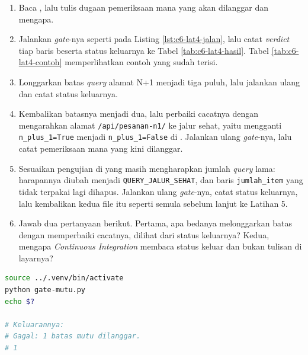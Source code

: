 \begin{enumerate}
  \item Baca , lalu tulis dugaan
        pemeriksaan mana yang akan dilanggar dan mengapa.
  \item Jalankan \textit{gate}-nya seperti pada Listing \ref{lst:c6-lat4-jalan},
        lalu catat \textit{verdict} tiap baris beserta status keluarnya ke
        Tabel \ref{tab:c6-lat4-hasil}. Tabel \ref{tab:c6-lat4-contoh}
        memperlihatkan contoh yang sudah terisi.
  \item Longgarkan batas \textit{query} alamat N+1 menjadi tiga puluh, lalu
        jalankan ulang dan catat status keluarnya.
  \item Kembalikan batasnya menjadi dua, lalu perbaiki cacatnya dengan
        mengarahkan alamat \texttt{/api/pesanan-n1/} ke jalur sehat, yaitu
        mengganti \texttt{n\_plus\_1=True} menjadi \texttt{n\_plus\_1=False}
        di . Jalankan ulang
        \textit{gate}-nya, lalu catat pemeriksaan mana yang kini dilanggar.
  \item Sesuaikan pengujian di 
        yang masih mengharapkan jumlah \textit{query} lama: harapannya diubah
        menjadi \texttt{QUERY\_JALUR\_SEHAT}, dan baris \texttt{jumlah\_item}
        yang tidak terpakai lagi dihapus. Jalankan ulang \textit{gate}-nya,
        catat status keluarnya, lalu kembalikan kedua file itu seperti semula
        sebelum lanjut ke Latihan 5.
  \item Jawab dua pertanyaan berikut. Pertama, apa bedanya melonggarkan batas
        dengan memperbaiki cacatnya, dilihat dari status keluarnya? Kedua,
        mengapa \textit{Continuous Integration} membaca status keluar dan
        bukan tulisan di layarnya?
\end{enumerate}

\begin{lstlisting}[language=bash, caption={Menjalankan gate mutu dan membaca status keluarnya, tersedia di \berkas{sources/chapter06/gate-mutu.py}}, label={lst:c6-lat4-jalan}]
source ../.venv/bin/activate
python gate-mutu.py
echo $?

# Keluarannya:
# Gagal: 1 batas mutu dilanggar.
# 1
\end{lstlisting}

